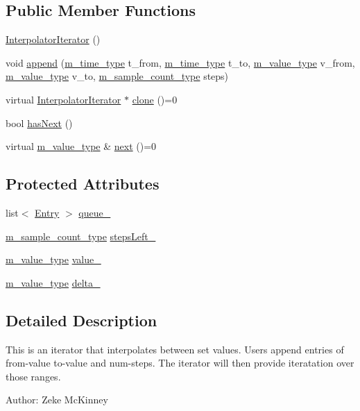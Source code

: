 \subsection*{Public Member Functions}
\begin{CompactItemize}
\item 
\hyperlink{classInterpolatorIterator_a0}{Interpolator\-Iterator} ()
\item 
void \hyperlink{classInterpolatorIterator_a1}{append} (\hyperlink{Types_8h_a2}{m\_\-time\_\-type} t\_\-from, \hyperlink{Types_8h_a2}{m\_\-time\_\-type} t\_\-to, \hyperlink{Types_8h_a3}{m\_\-value\_\-type} v\_\-from, \hyperlink{Types_8h_a3}{m\_\-value\_\-type} v\_\-to, \hyperlink{Types_8h_a1}{m\_\-sample\_\-count\_\-type} steps)
\item 
virtual \hyperlink{classInterpolatorIterator}{Interpolator\-Iterator} $\ast$ \hyperlink{classInterpolatorIterator_a2}{clone} ()=0
\item 
bool \hyperlink{classInterpolatorIterator_a3}{has\-Next} ()
\item 
virtual \hyperlink{Types_8h_a3}{m\_\-value\_\-type} \& \hyperlink{classInterpolatorIterator_a4}{next} ()=0
\end{CompactItemize}
\subsection*{Protected Attributes}
\begin{CompactItemize}
\item 
list$<$ \hyperlink{classInterpolatorIterator_1_1Entry}{Entry} $>$ \hyperlink{classInterpolatorIterator_p0}{queue\_\-}
\item 
\hyperlink{Types_8h_a1}{m\_\-sample\_\-count\_\-type} \hyperlink{classInterpolatorIterator_p1}{steps\-Left\_\-}
\item 
\hyperlink{Types_8h_a3}{m\_\-value\_\-type} \hyperlink{classInterpolatorIterator_p2}{value\_\-}
\item 
\hyperlink{Types_8h_a3}{m\_\-value\_\-type} \hyperlink{classInterpolatorIterator_p3}{delta\_\-}
\end{CompactItemize}


\subsection{Detailed Description}
This is an iterator that interpolates between set values. Users append entries of from-value to-value and num-steps. The iterator will then provide iteratation over those ranges. \begin{Desc}
\item[Author:]Zeke Mc\-Kinney \end{Desc}




